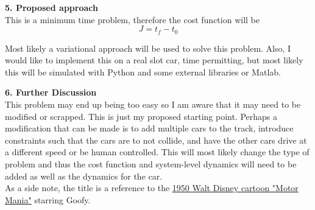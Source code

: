 \documentclass[12pt]{article}
\begin{document}
\textbf{5. Proposed approach}\\

This is a minimum time problem, therefore the cost function will be \\

\begin{equation}
  J = t_f - t_0
\end{equation}

Most likely a variational approach will be used to solve this problem. Also, I
would like to implement this on a real slot car, time permitting, but most
likely this will be simulated with Python and some external libraries or
Matlab.

\textbf{6. Further Discussion}\\

This problem may end up being too easy so I am aware that it may need to be
modified or scrapped. This is just my proposed starting point. Perhaps a
modification that can be made is to add multiple cars to the track, introduce
constraints such that the cars are to not collide, and have the other cars drive
at a different speed or be human controlled. This will most likely change the
type of problem and thus the cost function and system-level dynamics will need
to be added as well as the dynamics for the car. \\

As a side note, the title is a reference to the
\href{https://youtu.be/HdgVcGjzgR4}{1950 Walt Disney cartoon "Motor Mania"}
starring Goofy.

% 
% 

\end{document}
